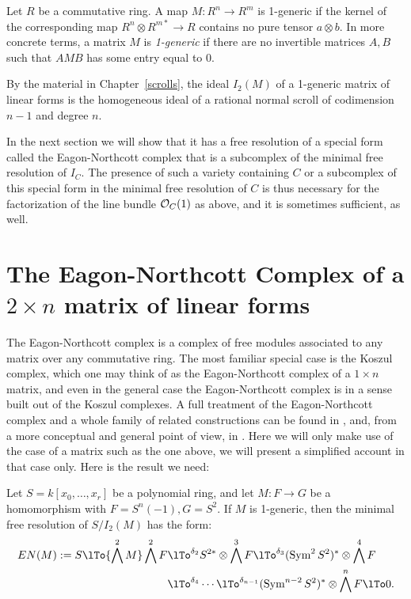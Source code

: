 \begin{definition}
Let $R$ be a commutative ring. A map $M:R^n\to R^m$ is 1-generic if the kernel of the corresponding
 map $R^{n}\otimes R^{m*} \to R$  contains no pure tensor $a\otimes b$. In more concrete terms, a matrix
$M$ is \emph{1-generic} if there are no invertible matrices $A,B$ such that  $AMB$ has some entry equal to 0.
\end{definition}

By the material in Chapter~\ref{scrolls}, the ideal $I_2(M)$ of a 1-generic matrix of linear forms is the homogeneous ideal of a rational normal 
scroll
of codimension $n-1$ and degree $n$. 

In the next section we will show that it has a free resolution of a special form called the 
Eagon-Northcott complex that is a subcomplex of the minimal free resolution of $I_C$. The presence of such a variety containing $C$ or
a subcomplex of this special form in the minimal free resolution of $C$ is thus necessary for the 
factorization of the line bundle ${\mathcal O}_C(1)$ as above, and it is sometimes sufficient, as well.

\section{The Eagon-Northcott Complex of a $2\times n$ matrix of linear forms}

The Eagon-Northcott complex is a complex of free modules associated to any matrix over any commutative ring. The most familiar special case is the Koszul complex, which one may think of as the Eagon-Northcott complex of a $1\times n$ matrix, and  even in the general case the Eagon-Northcott complex is in a sense built out of the Koszul complexes. A full treatment of the Eagon-Northcott complex and a whole family of related constructions can be found in 
\cite[Appendix ***]{E}, and, from a more conceptual and general point of view, in \cite{Weyman}. Here we will only
make use of the case of a matrix such as the one above, we will present a simplified account in that case only. Here is the result we need:

\begin{theorem}\label{Eagon-Northcott}
 Let $S = k[x_0,\dots, x_r]$ be a polynomial ring,  and let $M: F\to G$ be a homomorphism with
 $F = S^n(-1), G= S^2$. If $M$ is 1-generic, then the minimal free resolution of $S/I_2(M)$ has the form:
\begin{align*}
EN(M) := 
S \lTo{\bigwedge^2 M} 
 \bigwedge^2 F&
 \lTo^{\delta_{2}}
 S^{2*}\otimes \bigwedge^3 F  \lTo^{\delta_{3}}
  (\Sym^2S^{2})^*\otimes\bigwedge^4F  \\
 &\lTo^{\delta_{4}}\cdots\lTo^{\delta_{n-1}} 
(\Sym^{n-2}S^{2})^*\otimes\bigwedge^nF 
 \lTo 0.
\end{align*}
\end{theorem}

